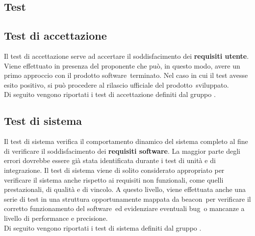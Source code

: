 \documentclass[../PianoDiQualifica.tex]{subfiles}
\begin{document}
\begin{appendices}

\section{Test}
	\subsection{Test di accettazione}
	Il test di accettazione serve ad accertare il soddisfacimento dei \textbf{requisiti utente}. Viene effettuato in presenza del proponente che può, in questo modo, avere un primo approccio con il prodotto software\g\ terminato. Nel caso in cui il test avesse esito positivo, si può procedere al rilascio ufficiale del prodotto\g\ 
sviluppato.\\
	Di seguito vengono riportati i test di accettazione definiti dal gruppo \leaf.
	\subsection{Test di sistema}
	Il test di sistema verifica il comportamento dinamico del sistema completo al fine di verificare il soddisfacimento dei \textbf{requisiti software}. La maggior parte degli errori dovrebbe essere già stata identificata durante i test di unità e di integrazione. Il test di sistema viene di solito considerato appropriato per verificare il sistema anche rispetto ai requisiti non funzionali, come quelli prestazionali, di qualità e di vincolo. A questo livello, viene effettuata anche una serie di test in una struttura opportunamente mappata da beacon\g\ per verificare il corretto funzionamento del software\g\ ed evidenziare eventuali bug\g\ o mancanze a livello di performance e precisione.\\
	Di seguito vengono riportati i test di sistema definiti dal gruppo \leaf.
\end{appendices}
\end{document}
